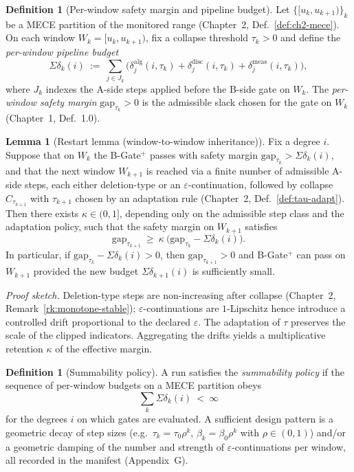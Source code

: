 \documentclass[11pt]{article}
\numberwithin{equation}{section}
\theoremstyle{plain}
\theoremstyle{definition}
\theoremstyle{remark}
\theoremstyle{plain}
\theoremstyle{definition}
\numberwithin{equation}{section}
\newtheorem{lemma}[theorem]{Lemma}
\theoremstyle{definition}
\newtheorem{definition}[theorem]{Definition}
\numberwithin{equation}{section}
\theoremstyle{plain}
\theoremstyle{definition}
\theoremstyle{remark}
\begin{document}
\begin{definition}[Per-window safety margin and pipeline budget]\label{def:window-budget}
Let $\{[u_k,u_{k+1})\}_k$ be a MECE partition of the monitored range (Chapter~2, Def.~\ref{def:ch2-mece}). On each window $W_k=[u_k,u_{k+1})$, fix a collapse threshold $\tau_k>0$ and define the \emph{per-window pipeline budget}
\[
\Sigma\delta_k(i)\ :=\ \sum_{j\in J_k} \bigl(\delta^{\mathrm{alg}}_{j}(i,\tau_k)+\delta^{\mathrm{disc}}_{j}(i,\tau_k)+\delta^{\mathrm{meas}}_{j}(i,\tau_k)\bigr),
\]
where $J_k$ indexes the A-side steps applied before the B-side gate on $W_k$. The \emph{per-window safety margin} $\mathrm{gap}_{\tau_k}>0$ is the admissible slack chosen for the gate on $W_k$ (Chapter~1, Def.~1.0).
\end{definition}

\begin{lemma}[Restart lemma (window-to-window inheritance)]\label{lem:restart}
Fix a degree $i$. Suppose that on $W_k$ the B-Gate$^{+}$ passes with safety margin $\mathrm{gap}_{\tau_k}>\Sigma\delta_k(i)$, and that the next window $W_{k+1}$ is reached via a finite number of admissible A-side steps, each either deletion-type or an $\varepsilon$-continuation, followed by collapse $C_{\tau_{k+1}}$ with $\tau_{k+1}$ chosen by an adaptation rule (Chapter~2, Def.~\ref{def:tau-adapt}). Then there exists $\kappa\in (0,1]$, depending only on the admissible step class and the adaptation policy, such that the safety margin on $W_{k+1}$ satisfies
\[
\mathrm{gap}_{\tau_{k+1}}\ \ge\ \kappa\ \bigl(\mathrm{gap}_{\tau_k}-\Sigma\delta_k(i)\bigr).
\]
In particular, if $\mathrm{gap}_{\tau_k}-\Sigma\delta_k(i)>0$, then $\mathrm{gap}_{\tau_{k+1}}>0$ and B-Gate$^{+}$ can pass on $W_{k+1}$ provided the new budget $\Sigma\delta_{k+1}(i)$ is sufficiently small.
\end{lemma}

\noindent\emph{Proof sketch.} Deletion-type steps are non-increasing after collapse (Chapter~2, Remark~\ref{rk:monotone-stable}); $\varepsilon$-continuations are $1$-Lipschitz hence introduce a controlled drift proportional to the declared $\varepsilon$. The adaptation of $\tau$ preserves the scale of the clipped indicators. Aggregating the drifts yields a multiplicative retention $\kappa$ of the effective margin.

\begin{definition}[Summability policy]\label{def:summability}
A run satisfies the \emph{summability policy} if the sequence of per-window budgets on a MECE partition obeys
\[
\sum_k \Sigma\delta_k(i)\ <\ \infty
\]
for the degrees $i$ on which gates are evaluated. A sufficient design pattern is a geometric decay of step sizes (e.g.\ $\tau_k=\tau_0\rho^k$, $\beta_k=\beta_0\rho^k$ with $\rho\in (0,1)$) and/or a geometric damping of the number and strength of $\varepsilon$-continuations per window, all recorded in the manifest (Appendix~G).
\end{definition}
\end{document}
